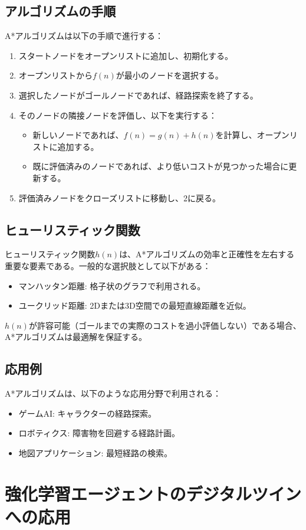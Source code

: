 \subsection*{アルゴリズムの手順}
A*アルゴリズムは以下の手順で進行する：
\begin{enumerate}
    \item スタートノードをオープンリストに追加し、初期化する。
    \item オープンリストから$f(n)$が最小のノードを選択する。
    \item 選択したノードがゴールノードであれば、経路探索を終了する。
    \item そのノードの隣接ノードを評価し、以下を実行する：
    \begin{itemize}
        \item 新しいノードであれば、$f(n) = g(n) + h(n)$を計算し、オープンリストに追加する。
        \item 既に評価済みのノードであれば、より低いコストが見つかった場合に更新する。
    \end{itemize}
    \item 評価済みノードをクローズリストに移動し、2に戻る。
\end{enumerate}

\subsection*{ヒューリスティック関数}
ヒューリスティック関数$h(n)$は、A*アルゴリズムの効率と正確性を左右する重要な要素である。一般的な選択肢として以下がある：
\begin{itemize}
    \item マンハッタン距離: 格子状のグラフで利用される。
    \item ユークリッド距離: 2Dまたは3D空間での最短直線距離を近似。
\end{itemize}
$h(n)$が許容可能（ゴールまでの実際のコストを過小評価しない）である場合、A*アルゴリズムは最適解を保証する。

\subsection*{応用例}
A*アルゴリズムは、以下のような応用分野で利用される：
\begin{itemize}
    \item ゲームAI: キャラクターの経路探索。
    \item ロボティクス: 障害物を回避する経路計画。
    \item 地図アプリケーション: 最短経路の検索。
\end{itemize}

\section{強化学習エージェントのデジタルツインへの応用}



